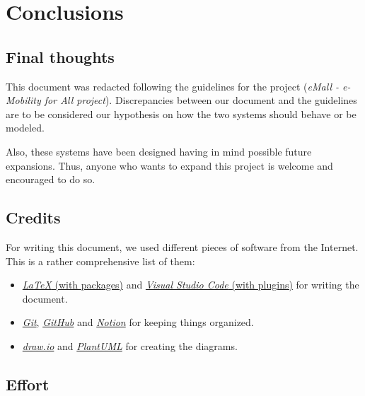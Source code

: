 \chapter{Conclusions} \label{conclusions}

\section{Final thoughts}

This document was redacted following the guidelines for the project (\textit{eMall - e-Mobility for All project}). Discrepancies between our document and the guidelines are to be considered our hypothesis on how the two systems should behave or be modeled.\medskip

Also, these systems have been designed having in mind possible future expansions. Thus, anyone who wants to expand this project is welcome and encouraged to do so.

\section{Credits} \label{credits}

For writing this document, we used different pieces of software from the Internet. This is a rather comprehensive list of them:
\begin{itemize}
    \item \href{https://www.latex-project.org/}{\textit{\LaTeX} (with packages)} and \href{https://code.visualstudio.com/}{\textit{Visual Studio Code} (with plugins)} for writing the document.
    \item \href{https://git-scm.com/}{\textit{Git}}, \href{https://github.com/}{\textit{GitHub}} and \href{https://www.notion.so/}{\textit{Notion}} for keeping things organized.
    \item \href{https://www.diagrams.net/}{\textit{draw.io}} and \href{https://plantuml.com/}{\textit{PlantUML}} for creating the diagrams.
\end{itemize}

\section{Effort}

